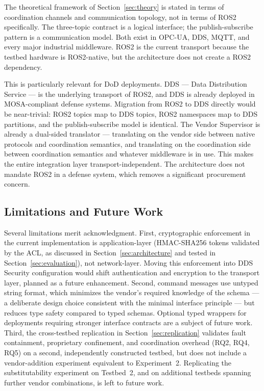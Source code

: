 \documentclass[a4paper,fleqn]{cas-dc}
\begin{document}
The theoretical framework of Section~\ref{sec:theory} is stated in terms of coordination channels and communication topology, not in terms of ROS2 specifically. The three-topic contract is a logical interface; the publish-subscribe pattern is a communication model. Both exist in OPC-UA, DDS, MQTT, and every major industrial middleware. ROS2 is the current transport because the testbed hardware is ROS2-native, but the architecture does not create a ROS2 dependency.

This is particularly relevant for DoD deployments. DDS --- Data Distribution Service --- is the underlying transport of ROS2, and DDS is already deployed in MOSA-compliant defense systems. Migration from ROS2 to DDS directly would be near-trivial: ROS2 topics map to DDS topics, ROS2 namespaces map to DDS partitions, and the publish-subscribe model is identical. The Vendor Supervisor is already a dual-sided translator --- translating on the vendor side between native protocols and coordination semantics, and translating on the coordination side between coordination semantics and whatever middleware is in use. This makes the entire integration layer transport-independent. The architecture does not mandate ROS2 in a defense system, which removes a significant procurement concern.

\subsection{Limitations and Future Work}

Several limitations merit acknowledgment. First, cryptographic enforcement in the current implementation is application-layer (HMAC-SHA256 tokens validated by the ACL, as discussed in Section~\ref{sec:architecture} and tested in Section~\ref{sec:evaluation}), not network-layer. Moving this enforcement into DDS Security configuration would shift authentication and encryption to the transport layer, planned as a future enhancement. Second, command messages use untyped string format, which minimizes the vendor's required knowledge of the schema --- a deliberate design choice consistent with the minimal interface principle --- but reduces type safety compared to typed schemas. Optional typed wrappers for deployments requiring stronger interface contracts are a subject of future work. Third, the cross-testbed replication in Section~\ref{sec:replication} validates fault containment, proprietary confinement, and coordination overhead (RQ2, RQ4, RQ5) on a second, independently constructed testbed, but does not include a vendor-addition experiment equivalent to Experiment~2. Replicating the substitutability experiment on Testbed~2, and on additional testbeds spanning further vendor combinations, is left to future work.
\end{document}
